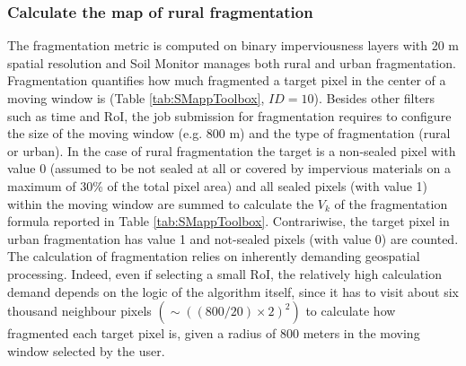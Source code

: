 \documentclass[APA,LATO1COL,doublespace]{WileyNJD-v2}
\newcommand{\toberevised}[1]{\emph{\textcolor{red}{#1}}} %
\begin{document}
\subsubsection{Calculate the map of rural fragmentation}
The fragmentation metric is computed on binary imperviousness layers with 20 m spatial resolution and Soil Monitor manages both rural and urban fragmentation.
Fragmentation quantifies how much fragmented a target pixel in the center of a moving window is (Table \ref{tab:SMappToolbox}, $ID = 10$).
Besides other filters such as time and RoI, the job submission for fragmentation requires to configure the size of the moving window (e.g. 800 m) and the type of fragmentation (rural or urban).
In the case of rural fragmentation the target is a non-sealed pixel with value 0 (assumed to be not sealed at all or covered by impervious materials on a maximum of 30\% of the total pixel area) and all sealed pixels (with value 1) within the moving window are summed to calculate the $V_k$ of the fragmentation formula reported in Table \ref{tab:SMappToolbox}.
Contrariwise, the target pixel in urban fragmentation has value 1 and not-sealed pixels (with value 0) are counted.
The calculation of fragmentation relies on inherently demanding geospatial processing.
Indeed, even if selecting a small RoI, the relatively high calculation demand depends on the logic of the algorithm itself, since it has to visit about six thousand neighbour pixels $\left( \sim \left( \left(800/20\right)\times2 \right)^2 \right)$ to calculate how fragmented each target pixel is, given a radius of 800 meters in the moving window selected by the user.
\end{document}
